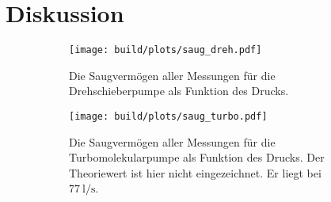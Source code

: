 \newpage
\section{Diskussion}



\begin{figure}[ht]
    \begin{subfigure}{0.46\textwidth}
            \centering
            \texttt{[image: build/plots/saug\_dreh.pdf]}
            \caption{Die Saugvermögen aller Messungen für die Drehschieberpumpe als Funktion des Drucks.
            }
            \label{img:saug_dreh}
    \end{subfigure}
    \hfill
    \begin{subfigure}{0.46\textwidth}
            \centering
            \texttt{[image: build/plots/saug\_turbo.pdf]}
            \caption{Die Saugvermögen aller Messungen für die Turbomolekularpumpe als Funktion des Drucks.
            Der Theoriewert ist hier nicht eingezeichnet. Er liegt bei $\SI{77}{\litre\per\second}$.}
            \label{img:saug_turbo}
    \end{subfigure}
    \caption{}
    \label{img:4}
\end{figure}


